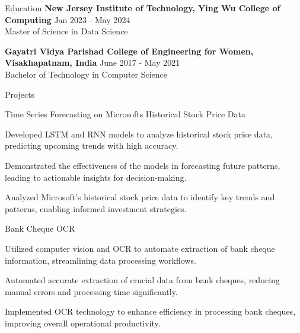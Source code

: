 \documentclass{resume} %
\begin{document}
\begin{rSection}{Education}
                        \textbf{New Jersey Institute of Technology, Ying Wu College of Computing} \hfill {Jan 2023 - May 2024} \\
                            {Master of Science in Data Science}
                         
             
         
                        \textbf{Gayatri Vidya Parishad College of Engineering for Women, Visakhapatnam, India} \hfill {June 2017 - May 2021} \\
                            {Bachelor of Technology in Computer Science}
                         
             
         
    \end{rSection}

    \begin{rSection}{Projects}
                    \begin{rSubsection}
                                    {Time Series Forecasting on Microsofts Historical Stock Price Data}
                                {}{}{}
                                    \item Developed LSTM and RNN models to analyze historical stock price data, predicting upcoming trends with high accuracy.
                                    \item Demonstrated the effectiveness of the models in forecasting future patterns, leading to actionable insights for decision{-}making.
                                    \item Analyzed Microsoft's historical stock price data to identify key trends and patterns, enabling informed investment strategies.
                            \end{rSubsection}
                    \begin{rSubsection}
                                    {Bank Cheque OCR}
                                {}{}{}
                                    \item Utilized computer vision and OCR to automate extraction of bank cheque information, streamlining data processing workflows.
                                    \item Automated accurate extraction of crucial data from bank cheques, reducing manual errors and processing time significantly.
                                    \item Implemented OCR technology to enhance efficiency in processing bank cheques, improving overall operational productivity.
                            \end{rSubsection}
            \end{rSection}
\end{document}
